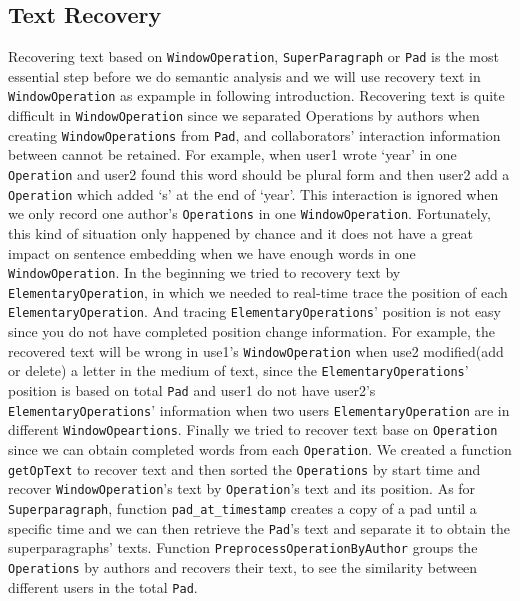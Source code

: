 \subsection{Text Recovery}
\label{sub:textRecovery}
Recovering text based on \texttt{WindowOperation}, \texttt{SuperParagraph} or \texttt{Pad} is the most essential step before we do semantic analysis and we will use recovery text in \texttt{WindowOperation} as expample in following introduction. Recovering text is quite difficult in \texttt{WindowOperation} since we separated Operations by authors when creating \texttt{WindowOperations} from \texttt{Pad}, and collaborators' interaction information between cannot be retained. For example, when user1 wrote `year' in one \texttt{Operation} and user2 found this word should be plural form and then user2 add a \texttt{Operation} which added `s' at the end of `year'. This interaction is ignored when we only record one author's \texttt{Operations} in one \texttt{WindowOperation}. Fortunately, this kind of situation only happened by chance and it does not have a great impact on sentence embedding when we have enough words in one \texttt{WindowOperation}. In the beginning we tried to recovery text by \texttt{ElementaryOperation}, in which we needed to real-time trace the position of each \texttt{ElementaryOperation}. And tracing \texttt{ElementaryOperations}' position is not easy since you do not have completed position change information.  For example, the recovered text will be wrong in use1's \texttt{WindowOperation} when use2 modified(add or delete) a letter in the medium of text, since the \texttt{ElementaryOperations}' position is based on total \texttt{Pad} and user1 do not have user2's \texttt{ElementaryOperations}' information when two users \texttt{ElementaryOperation} are in different \texttt{WindowOpeartions}. Finally we tried to recover text base on \texttt{Operation} since we can obtain completed words from each \texttt{Operation}. We created a function \texttt{getOpText} to recover text and then sorted the \texttt{Operations} by start time and recover \texttt{WindowOperation}'s text by \texttt{Operation}'s text and its position. As for \texttt{Superparagraph}, function \texttt{pad\_at\_timestamp} creates a copy of a pad until a specific time and we can then retrieve the \texttt{Pad}'s text and separate it to obtain the superparagraphs' texts. Function \texttt{PreprocessOperationByAuthor} groups the \texttt{Operations} by authors and recovers their text, to see the similarity between different users in the total \texttt{Pad}.


